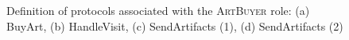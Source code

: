 \documentclass[paper=letter, fontsize=12pt]{article}
\begin{document}
\begin{figure}[H]
  \begin{center}
    \caption{Definition of protocols associated with the \textsc{ArtBuyer} role: (a) \fontfamily{\sfdefault}\selectfont BuyArt, (b) HandleVisit, (c) SendArtifacts (1), (d) SendArtifacts (2)}
    \label{fig:ab_protocol}
  \end{center}
\end{figure}
\end{document}
